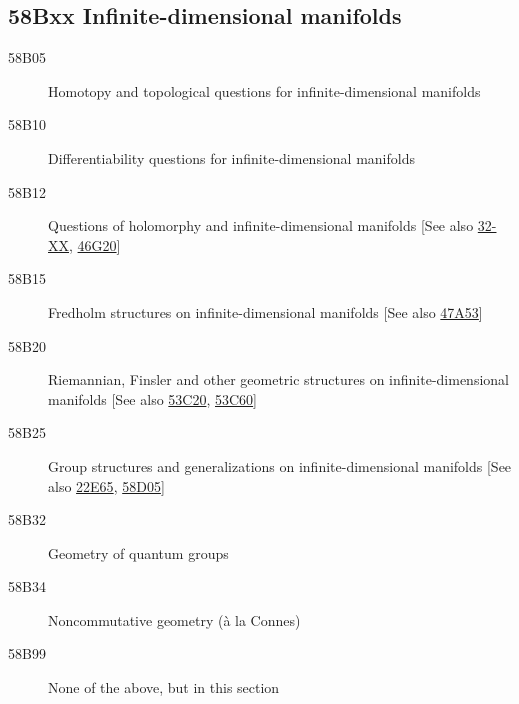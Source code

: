 \subsection*{58Bxx  Infinite-dimensional manifolds }\label{58Bxx}
\begin{description}  
\item [58B05]\label{58B05} Homotopy and topological questions for infinite-dimensional manifolds
\item [58B10]\label{58B10} Differentiability questions for infinite-dimensional manifolds
\item [58B12]\label{58B12} Questions of holomorphy and infinite-dimensional manifolds [See also \hyperref[32-XX]{32-XX}, \hyperref[46G20]{46G20}]
\item [58B15]\label{58B15} Fredholm structures on infinite-dimensional manifolds [See also \hyperref[47A53]{47A53}]
\item [58B20]\label{58B20} Riemannian, Finsler and other geometric structures  on infinite-dimensional manifolds [See also \hyperref[53C20]{53C20}, \hyperref[53C60]{53C60}]
\item [58B25]\label{58B25} Group structures and generalizations on infinite-dimensional manifolds [See also \hyperref[22E65]{22E65}, \hyperref[58D05]{58D05}]
\item [58B32]\label{58B32} Geometry of quantum groups
\item [58B34]\label{58B34} Noncommutative geometry (\`{a} la Connes)
\item [58B99]\label{58B99} None of the above, but in this section
\end{description}
